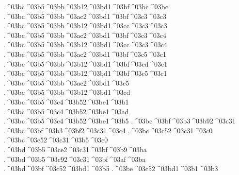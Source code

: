 {.^^^^03bc^^^^03b5^^^^03bb^^^^03b12^^^^03bd1^^^^03bf^^^^03bc^^^^03bc
.^^^^03bc^^^^03b5^^^^03bb^^^^03ac2^^^^03bd1^^^^03bf^^^^03c3^^^^03c3 		%
.^^^^03bc^^^^03b5^^^^03bb^^^^03b12^^^^03bd1^^^^03cc^^^^03c3^^^^03c3
.^^^^03bc^^^^03b5^^^^03bb^^^^03ac2^^^^03bd1^^^^03bf^^^^03c3^^^^03c4 		%
.^^^^03bc^^^^03b5^^^^03bb^^^^03b12^^^^03bd1^^^^03cc^^^^03c3^^^^03c4
.^^^^03bc^^^^03b5^^^^03bb^^^^03ac2^^^^03bd1^^^^03bf^^^^03c5^^^^03c1 		%
.^^^^03bc^^^^03b5^^^^03bb^^^^03b12^^^^03bd1^^^^03bf^^^^03cd^^^^03c1
.^^^^03bc^^^^03b5^^^^03bb^^^^03b12^^^^03bd1^^^^03bf^^^^03c5^^^^03c1  		%
.^^^^03bc^^^^03b5^^^^03bb^^^^03ac2^^^^03bd1^^^^03c5		%
.^^^^03bc^^^^03b5^^^^03bb^^^^03b12^^^^03bd1^^^^03cd
.^^^^03bc^^^^03b5^^^^03c4^^^^03b52^^^^03be1^^^^03b1   		%
.^^^^03bc^^^^03b5^^^^03c4^^^^03b52^^^^03be1^^^^03ad  		%
.^^^^03bc^^^^03b5^^^^03c4^^^^03b52^^^^03be1^^^^03b5
.^^^^03bc^^^^03bf^^^^03b3^^^^03b92^^^^03c31    		%
.^^^^03bc^^^^03bf^^^^03b3^^^^03bf2^^^^03c31^^^^03c4    		%
.^^^^03bc^^^^03c52^^^^03c31^^^^03c0      		%
.^^^^03bc^^^^03c52^^^^03c31^^^^03b5^^^^03c0   		%
.^^^^03bd^^^^03b5^^^^03ce2^^^^03c31^^^^03bf^^^^03b9^^^^03ba  		%
.^^^^03bd^^^^03b5^^^^03c92^^^^03c31^^^^03bf^^^^03af^^^^03ba
.^^^^03bd^^^^03bf^^^^03c52^^^^03bd1^^^^03b5     		%
.^^^^03be^^^^03c52^^^^03bd1^^^^03b1^^^^03b3		%
}
